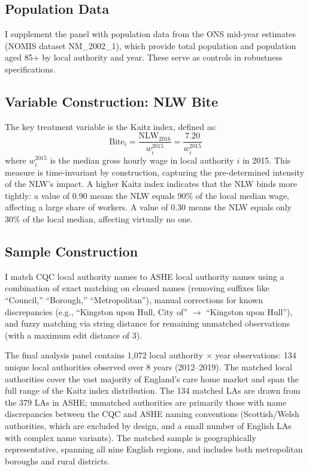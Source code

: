 \documentclass[12pt]{article}
\begin{document}
\subsection{Population Data}

I supplement the panel with population data from the ONS mid-year estimates (NOMIS dataset NM\_2002\_1), which provide total population and population aged 85+ by local authority and year. These serve as controls in robustness specifications.

\subsection{Variable Construction: NLW Bite}

The key treatment variable is the Kaitz index, defined as:
\begin{equation}
    \text{Bite}_i = \frac{\text{NLW}_{2016}}{w_i^{2015}} = \frac{7.20}{w_i^{2015}}
\end{equation}
where $w_i^{2015}$ is the median gross hourly wage in local authority $i$ in 2015. This measure is time-invariant by construction, capturing the pre-determined intensity of the NLW's impact. A higher Kaitz index indicates that the NLW binds more tightly: a value of 0.90 means the NLW equals 90\% of the local median wage, affecting a large share of workers. A value of 0.30 means the NLW equals only 30\% of the local median, affecting virtually no one.

\subsection{Sample Construction}

I match CQC local authority names to ASHE local authority names using a combination of exact matching on cleaned names (removing suffixes like ``Council,'' ``Borough,'' ``Metropolitan''), manual corrections for known discrepancies (e.g., ``Kingston upon Hull, City of'' $\to$ ``Kingston upon Hull''), and fuzzy matching via string distance for remaining unmatched observations (with a maximum edit distance of 3).

The final analysis panel contains 1,072 local authority $\times$ year observations: 134 unique local authorities observed over 8 years (2012--2019). The matched local authorities cover the vast majority of England's care home market and span the full range of the Kaitz index distribution. The 134 matched LAs are drawn from the 379 LAs in ASHE; unmatched authorities are primarily those with name discrepancies between the CQC and ASHE naming conventions (Scottish/Welsh authorities, which are excluded by design, and a small number of English LAs with complex name variants). The matched sample is geographically representative, spanning all nine English regions, and includes both metropolitan boroughs and rural districts.
\end{document}
